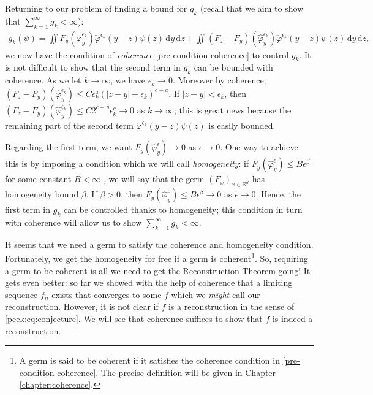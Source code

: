 Returning to our problem of finding a bound for $g_k$ (recall that we aim to show that $\sum^\infty_{k=1} g_k < \infty$):
\begin{align*}
    g_k(\psi) = \iint F_y(\hat \varphi^{\epsilon_k}_y) \check \varphi^{\epsilon_k}(y-z) \psi(z) \, \mathrm{d}y\, \mathrm{d}z 
    + \iint (F_z - F_y)(\hat \varphi^{\epsilon_k}_y) \check \varphi^{\epsilon_k}(y-z) \psi(z) \, \mathrm{d}y\, \mathrm{d}z,
\end{align*}
we now have the condition of \emph{coherence} \eqref{pre-condition-coherence} to control $g_k$. It is not difficult to show that the second term in $g_k$ can be bounded with coherence. As we let $k \to \infty$, we have $\epsilon_k \to 0$. Moreover by coherence, $(F_z - F_y)(\hat \varphi^{\epsilon_k}_y) \leq C \epsilon_k^{a} (|z-y| + \epsilon_k)^{c-a}$. If $|z-y| < \epsilon_k$, then $(F_z - F_y)(\hat \varphi^{\epsilon_k}_y) \leq C2^{c-y} \epsilon_k^c \to 0$ as $k \to \infty$; this is great news because the remaining part of the second term $\check \varphi^{\epsilon_k}(y-z) \psi(z)$ is easily bounded.

Regarding the first term, we want $F_y(\hat \varphi^{\epsilon}_y) \to 0$ as $\epsilon \to 0$. One way to achieve this is by imposing a condition which we will call \emph{homogeneity}: if $F_y(\hat \varphi^{\epsilon}_y) \leq B \epsilon^{\beta}$ for some constant $B < \infty$ , we will say that the germ $(F_x)_{x \in \mathbb{R}^d}$ has homogeneity bound $\beta$. If $\beta > 0$, then   $F_y(\hat \varphi^{\epsilon}_y) \leq B \epsilon^\beta \to 0$ as $\epsilon \to 0$. Hence, the first term in $g_k$ can be controlled thanks to homogeneity; this condition in turn with coherence will allow us to show $\sum^\infty_{k=1} g_k < \infty$. 

It seems that we need a germ to satisfy the coherence and homogeneity condition. Fortunately, we get the homogeneity for free if a germ is coherent\footnote{A germ is said to be coherent if it satisfies the coherence condition in \eqref{pre-condition-coherence}. The precise definition will be given in Chapter \ref{chapter:coherence}.}. So, requiring a germ to be coherent is all we need to get the Reconstruction Theorem going! It gets even better: so far we showed with the help of coherence that a limiting sequence $f_n$ exists that converges to some $f$ which we \emph{might} call our reconstruction. However, it is not clear if $f$ is a reconstruction in the sense of \eqref{peek:eq:conjecture}. We will see that coherence suffices to show that $f$ is indeed a reconstruction.

